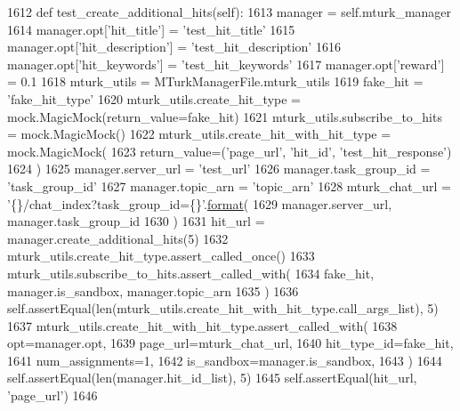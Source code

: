 \begin{DoxyCode}
1612     \textcolor{keyword}{def }test\_create\_additional\_hits(self):
1613         manager = self.mturk\_manager
1614         manager.opt[\textcolor{stringliteral}{'hit\_title'}] = \textcolor{stringliteral}{'test\_hit\_title'}
1615         manager.opt[\textcolor{stringliteral}{'hit\_description'}] = \textcolor{stringliteral}{'test\_hit\_description'}
1616         manager.opt[\textcolor{stringliteral}{'hit\_keywords'}] = \textcolor{stringliteral}{'test\_hit\_keywords'}
1617         manager.opt[\textcolor{stringliteral}{'reward'}] = 0.1
1618         mturk\_utils = MTurkManagerFile.mturk\_utils
1619         fake\_hit = \textcolor{stringliteral}{'fake\_hit\_type'}
1620         mturk\_utils.create\_hit\_type = mock.MagicMock(return\_value=fake\_hit)
1621         mturk\_utils.subscribe\_to\_hits = mock.MagicMock()
1622         mturk\_utils.create\_hit\_with\_hit\_type = mock.MagicMock(
1623             return\_value=(\textcolor{stringliteral}{'page\_url'}, \textcolor{stringliteral}{'hit\_id'}, \textcolor{stringliteral}{'test\_hit\_response'})
1624         )
1625         manager.server\_url = \textcolor{stringliteral}{'test\_url'}
1626         manager.task\_group\_id = \textcolor{stringliteral}{'task\_group\_id'}
1627         manager.topic\_arn = \textcolor{stringliteral}{'topic\_arn'}
1628         mturk\_chat\_url = \textcolor{stringliteral}{'\{\}/chat\_index?task\_group\_id=\{\}'}.\hyperlink{namespaceparlai_1_1chat__service_1_1services_1_1messenger_1_1shared__utils_a32e2e2022b824fbaf80c747160b52a76}{format}(
1629             manager.server\_url, manager.task\_group\_id
1630         )
1631         hit\_url = manager.create\_additional\_hits(5)
1632         mturk\_utils.create\_hit\_type.assert\_called\_once()
1633         mturk\_utils.subscribe\_to\_hits.assert\_called\_with(
1634             fake\_hit, manager.is\_sandbox, manager.topic\_arn
1635         )
1636         self.assertEqual(len(mturk\_utils.create\_hit\_with\_hit\_type.call\_args\_list), 5)
1637         mturk\_utils.create\_hit\_with\_hit\_type.assert\_called\_with(
1638             opt=manager.opt,
1639             page\_url=mturk\_chat\_url,
1640             hit\_type\_id=fake\_hit,
1641             num\_assignments=1,
1642             is\_sandbox=manager.is\_sandbox,
1643         )
1644         self.assertEqual(len(manager.hit\_id\_list), 5)
1645         self.assertEqual(hit\_url, \textcolor{stringliteral}{'page\_url'})
1646 
\end{DoxyCode}
\mbox{\label{classparlai_1_1mturk_1_1core_1_1legacy__2018_1_1test_1_1test__mturk__manager_1_1TestMTurkManagerConnectedFunctions_a3aa6819234860492b58f844f68d7dd04}} 
